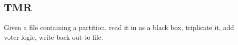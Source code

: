 \documentclass[12pt,final,oneside]{article} %
\begin{document}
\newpage
\subsection{TMR}
Given a file containing a partition, read it in as a black box, triplicate it, add voter logic, write back out to file.


\end{document}
